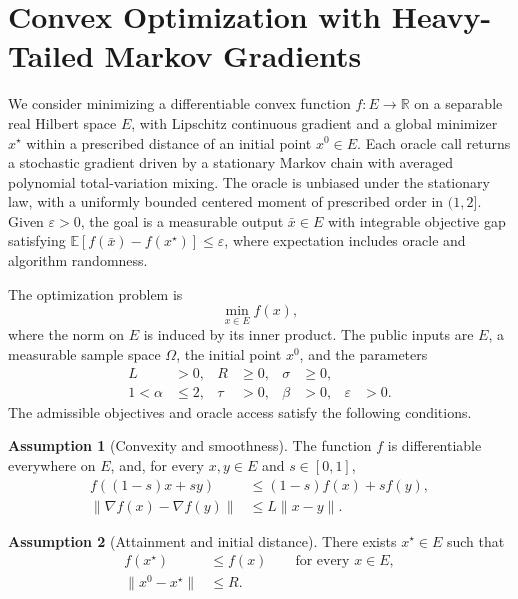 \documentclass[10pt]{article}
\theoremstyle{definition}
\newtheorem{assumption}{Assumption}
\begin{document}
\section*{Convex Optimization with Heavy-Tailed Markov Gradients}
We consider minimizing a differentiable convex function $f:E\to\mathbb{R}$ on a separable real Hilbert space $E$, with Lipschitz continuous gradient and a global minimizer $x^\star$ within a prescribed distance of an initial point $x^0\in E$. Each oracle call returns a stochastic gradient driven by a stationary Markov chain with averaged polynomial total-variation mixing. The oracle is unbiased under the stationary law, with a uniformly bounded centered moment of prescribed order in $(1,2]$. Given $\varepsilon>0$, the goal is a measurable output $\bar{x}\in E$ with integrable objective gap satisfying $\mathbb{E}[f(\bar{x})-f(x^\star)]\leq\varepsilon$, where expectation includes oracle and algorithm randomness.

The optimization problem is
\begin{equation}
\label{eq:problem}
\min_{x\in E} f(x),
\end{equation}
where the norm on $E$ is induced by its inner product. The public inputs are $E$, a measurable sample space $\Omega$, the initial point $x^0$, and the parameters
\begin{equation}
\begin{aligned}
L&>0, & R&\geq 0, & \sigma&\geq 0,\\
1<\alpha&\leq 2, & \tau&>0, & \beta&>0, & \varepsilon&>0.
\end{aligned}
\end{equation}
The admissible objectives and oracle access satisfy the following conditions.

\begin{assumption}[Convexity and smoothness]
The function $f$ is differentiable everywhere on $E$, and, for every $x,y\in E$ and $s\in[0,1]$,
\begin{align}
f((1-s)x+sy)&\leq (1-s)f(x)+sf(y),\\
\|\nabla f(x)-\nabla f(y)\|&\leq L\|x-y\|.
\end{align}
\end{assumption}

\begin{assumption}[Attainment and initial distance]
There exists $x^\star\in E$ such that
\begin{align}
f(x^\star)&\leq f(x) \qquad \text{for every }x\in E,\\
\|x^0-x^\star\|&\leq R.
\end{align}
\end{assumption}
\end{document}
